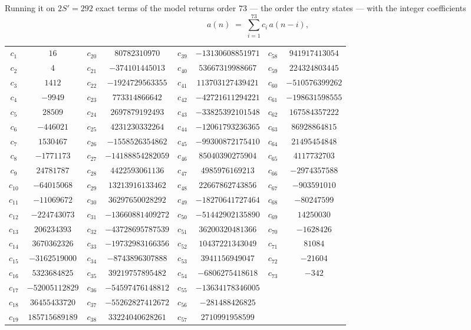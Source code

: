 \documentclass[11pt,a4paper]{article}
\theoremstyle{plain}
\theoremstyle{definition}
\begin{document}
Running it on $2S'=292$ exact terms of the model returns order $73$ --- the order the
entry states --- with the integer coefficients
\[
a(n)\;=\;\sum_{i=1}^{73}c_i\,a(n-i),
\]
\begin{center}\small
\begin{tabular}{cccccccc}
$c_{1}$ & $16$ & $c_{20}$ & $80782310970$ & $c_{39}$ & $-13130608851971$ & $c_{58}$ & $941917413054$ \\
$c_{2}$ & $4$ & $c_{21}$ & $-374101445013$ & $c_{40}$ & $53667319988667$ & $c_{59}$ & $224324803445$ \\
$c_{3}$ & $1412$ & $c_{22}$ & $-1924729563355$ & $c_{41}$ & $113703127439421$ & $c_{60}$ & $-510576399262$ \\
$c_{4}$ & $-9949$ & $c_{23}$ & $773314866642$ & $c_{42}$ & $-42721611294221$ & $c_{61}$ & $-198631598555$ \\
$c_{5}$ & $28509$ & $c_{24}$ & $2697879192493$ & $c_{43}$ & $-33825392101548$ & $c_{62}$ & $167584357222$ \\
$c_{6}$ & $-446021$ & $c_{25}$ & $4231230332264$ & $c_{44}$ & $-12061793236365$ & $c_{63}$ & $86928864815$ \\
$c_{7}$ & $1530467$ & $c_{26}$ & $-1558526354862$ & $c_{45}$ & $-99300872175410$ & $c_{64}$ & $21495454848$ \\
$c_{8}$ & $-1771173$ & $c_{27}$ & $-14188854282059$ & $c_{46}$ & $85040390275904$ & $c_{65}$ & $4117732703$ \\
$c_{9}$ & $24781787$ & $c_{28}$ & $4422593061136$ & $c_{47}$ & $4985976169213$ & $c_{66}$ & $-2974357588$ \\
$c_{10}$ & $-64015068$ & $c_{29}$ & $13213916133462$ & $c_{48}$ & $22667862743856$ & $c_{67}$ & $-903591010$ \\
$c_{11}$ & $-11069672$ & $c_{30}$ & $36297650028292$ & $c_{49}$ & $-18270641727464$ & $c_{68}$ & $-80247599$ \\
$c_{12}$ & $-224743073$ & $c_{31}$ & $-13660881409272$ & $c_{50}$ & $-51442902135890$ & $c_{69}$ & $14250030$ \\
$c_{13}$ & $206234393$ & $c_{32}$ & $-43728695787539$ & $c_{51}$ & $36200320481366$ & $c_{70}$ & $-1628426$ \\
$c_{14}$ & $3670362326$ & $c_{33}$ & $-19732983166356$ & $c_{52}$ & $10437221343049$ & $c_{71}$ & $81084$ \\
$c_{15}$ & $-3162519000$ & $c_{34}$ & $-8743896307888$ & $c_{53}$ & $3941156949047$ & $c_{72}$ & $-21604$ \\
$c_{16}$ & $5323684825$ & $c_{35}$ & $39219757895482$ & $c_{54}$ & $-6806275418618$ & $c_{73}$ & $-342$ \\
$c_{17}$ & $-52005112829$ & $c_{36}$ & $-54597476148812$ & $c_{55}$ & $-13634178346005$ &  &  \\
$c_{18}$ & $36455433720$ & $c_{37}$ & $-55262827412672$ & $c_{56}$ & $-281488426825$ &  &  \\
$c_{19}$ & $185715689189$ & $c_{38}$ & $33224040628261$ & $c_{57}$ & $2710991958599$ &  &  \\
\end{tabular}
\end{center}
\end{document}
